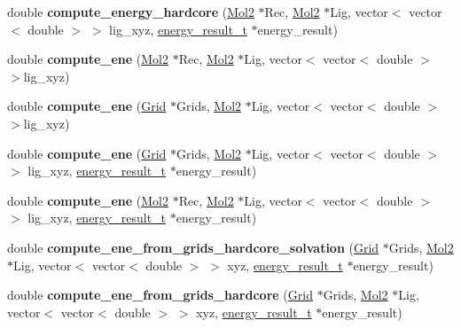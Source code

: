 \begin{DoxyCompactItemize}
\item 
\hypertarget{classEnergy2_aa07e503921a676ce153515fa7aa4b8ce}{
double {\bfseries compute\_\-energy\_\-hardcore} (\hyperlink{classMol2}{Mol2} $\ast$Rec, \hyperlink{classMol2}{Mol2} $\ast$Lig, vector$<$ vector$<$ double $>$ $>$ lig\_\-xyz, \hyperlink{structenergy__result__t}{energy\_\-result\_\-t} $\ast$energy\_\-result)}
\label{classEnergy2_aa07e503921a676ce153515fa7aa4b8ce}

\item 
\hypertarget{classEnergy2_af9aef75d1e5070a3f3e53cecccdec6b7}{
double {\bfseries compute\_\-ene} (\hyperlink{classMol2}{Mol2} $\ast$Rec, \hyperlink{classMol2}{Mol2} $\ast$Lig, vector$<$ vector$<$ double $>$ $>$lig\_\-xyz)}
\label{classEnergy2_af9aef75d1e5070a3f3e53cecccdec6b7}

\item 
\hypertarget{classEnergy2_acdc4ed50530d45cd313b5e8f7ebbe4b1}{
double {\bfseries compute\_\-ene} (\hyperlink{classGrid}{Grid} $\ast$Grids, \hyperlink{classMol2}{Mol2} $\ast$Lig, vector$<$ vector$<$ double $>$ $>$lig\_\-xyz)}
\label{classEnergy2_acdc4ed50530d45cd313b5e8f7ebbe4b1}

\item 
\hypertarget{classEnergy2_a74a7e5634998629b6fd52d42fa2a29a5}{
double {\bfseries compute\_\-ene} (\hyperlink{classGrid}{Grid} $\ast$Grids, \hyperlink{classMol2}{Mol2} $\ast$Lig, vector$<$ vector$<$ double $>$ $>$ lig\_\-xyz, \hyperlink{structenergy__result__t}{energy\_\-result\_\-t} $\ast$energy\_\-result)}
\label{classEnergy2_a74a7e5634998629b6fd52d42fa2a29a5}

\item 
\hypertarget{classEnergy2_a2318a84e61afa6a70f94f5f57c73e005}{
double {\bfseries compute\_\-ene} (\hyperlink{classMol2}{Mol2} $\ast$Rec, \hyperlink{classMol2}{Mol2} $\ast$Lig, vector$<$ vector$<$ double $>$ $>$ lig\_\-xyz, \hyperlink{structenergy__result__t}{energy\_\-result\_\-t} $\ast$energy\_\-result)}
\label{classEnergy2_a2318a84e61afa6a70f94f5f57c73e005}

\item 
\hypertarget{classEnergy2_a94aaca51dc2357f6e05ba1a63c1e04bb}{
double {\bfseries compute\_\-ene\_\-from\_\-grids\_\-hardcore\_\-solvation} (\hyperlink{classGrid}{Grid} $\ast$Grids, \hyperlink{classMol2}{Mol2} $\ast$Lig, vector$<$ vector$<$ double $>$ $>$ xyz, \hyperlink{structenergy__result__t}{energy\_\-result\_\-t} $\ast$energy\_\-result)}
\label{classEnergy2_a94aaca51dc2357f6e05ba1a63c1e04bb}

\item 
\hypertarget{classEnergy2_a502b0f9cc1cff0a5999ae8cbcc4b45fd}{
double {\bfseries compute\_\-ene\_\-from\_\-grids\_\-hardcore} (\hyperlink{classGrid}{Grid} $\ast$Grids, \hyperlink{classMol2}{Mol2} $\ast$Lig, vector$<$ vector$<$ double $>$ $>$ xyz, \hyperlink{structenergy__result__t}{energy\_\-result\_\-t} $\ast$energy\_\-result)}
\label{classEnergy2_a502b0f9cc1cff0a5999ae8cbcc4b45fd}


\end{DoxyCompactItemize}
